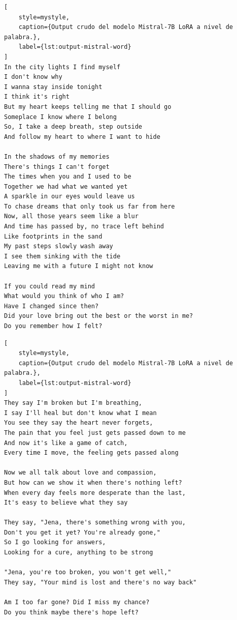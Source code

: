\begin{lstlisting}[
    style=mystyle,
    caption={Output crudo del modelo Mistral-7B LoRA a nivel de palabra.},
    label={lst:output-mistral-word}
]
In the city lights I find myself
I don't know why
I wanna stay inside tonight
I think it's right
But my heart keeps telling me that I should go
Someplace I know where I belong
So, I take a deep breath, step outside
And follow my heart to where I want to hide

In the shadows of my memories
There's things I can't forget
The times when you and I used to be
Together we had what we wanted yet
A sparkle in our eyes would leave us
To chase dreams that only took us far from here
Now, all those years seem like a blur
And time has passed by, no trace left behind
Like footprints in the sand
My past steps slowly wash away
I see them sinking with the tide
Leaving me with a future I might not know

If you could read my mind
What would you think of who I am?
Have I changed since then?
Did your love bring out the best or the worst in me?
Do you remember how I felt?
\end{lstlisting}
\clearpage

\begin{lstlisting}[
    style=mystyle,
    caption={Output crudo del modelo Mistral-7B LoRA a nivel de palabra.},
    label={lst:output-mistral-word}
]
They say I'm broken but I'm breathing,
I say I'll heal but don't know what I mean
You see they say the heart never forgets,
The pain that you feel just gets passed down to me
And now it's like a game of catch,
Every time I move, the feeling gets passed along

Now we all talk about love and compassion,
But how can we show it when there's nothing left?
When every day feels more desperate than the last,
It's easy to believe what they say

They say, "Jena, there's something wrong with you,
Don't you get it yet? You're already gone,"
So I go looking for answers,
Looking for a cure, anything to be strong

"Jena, you're too broken, you won't get well,"
They say, "Your mind is lost and there's no way back"

Am I too far gone? Did I miss my chance?
Do you think maybe there's hope left?
\end{lstlisting}

\clearpage


